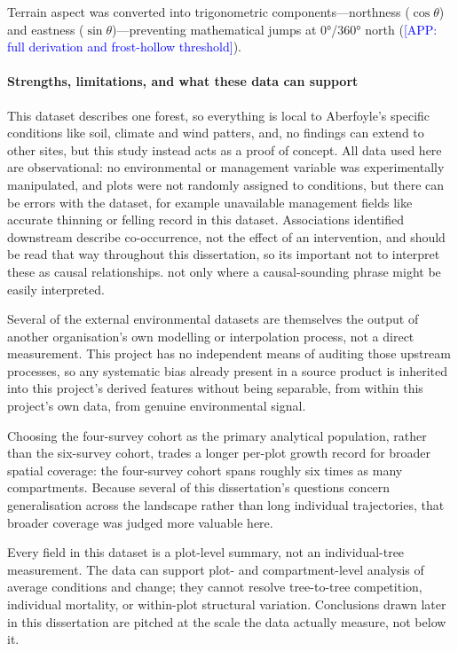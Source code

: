\documentclass[11pt,a4paper]{report}
\newcommand{\app}[1]{\textcolor{blue}{[APP: #1]}}
\begin{document}
Terrain aspect was converted into trigonometric components—northness ($\cos\theta$) and eastness ($\sin\theta$)—preventing mathematical jumps at 0°/360° north \cite{moisen2002Comparing_C3_LID} (\app{full derivation and frost-hollow threshold}).


\paragraph{Strengths, limitations, and what these data can support}
\label{sec:data-strengths-limitations}
This dataset describes one forest, so everything is local to Aberfoyle's specific conditions like soil, climate and wind patters, and, no findings can extend to other sites, but this study instead acts as a proof of concept.  
All data used here are observational: no environmental or management variable was experimentally
manipulated, and plots were not randomly assigned to conditions, but there can be errors with the dataset, for example unavailable management fields like accurate thinning or felling record in this dataset. Associations identified downstream describe co-occurrence, not the effect of an intervention, and should be read that way throughout this dissertation, so its important not to interpret these as causal relationships. not only where a causal-sounding phrase might be easily interpreted. 

Several of the external environmental datasets are themselves the output of another organisation's
own modelling or interpolation process, not a direct measurement. This project has no independent
means of auditing those upstream processes, so any systematic bias already present in a source
product is inherited into this project's derived features without being separable, from within
this project's own data, from genuine environmental signal.

Choosing the four-survey cohort as the primary analytical population, rather than the six-survey
cohort, trades a longer per-plot growth record for broader spatial coverage: the four-survey
cohort spans roughly six times as many compartments. Because several of this dissertation's
questions concern generalisation across the landscape rather than long individual trajectories,
that broader coverage was judged more valuable here.

Every field in this dataset is a plot-level summary, not an individual-tree measurement. The data
can support plot- and compartment-level analysis of average conditions and change; they cannot
resolve tree-to-tree competition, individual mortality, or within-plot structural variation.
Conclusions drawn later in this dissertation are pitched at the scale the data actually measure,
not below it. 
\end{document}
